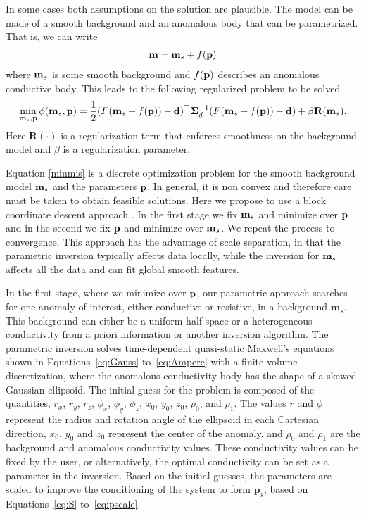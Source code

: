 \documentclass[letterpaper,11pt]{article}
\newcommand{\bfm}{{\bf m}}
\newcommand{\bfd}{{\bf d}}
\newcommand{\bfp}{{\bf p}}
\newcommand{\hf}{\frac 12}
\newcommand{\bfSigma}{{\boldsymbol \Sigma}}
\begin{document}
In some cases both assumptions on the solution are plausible. The model can be made of
a smooth background and an anomalous body that can be parametrized. That is, we can write
\begin{eqnarray}
\label{modfun2}
\bfm = \bfm_{s} + f(\bfp)
\end{eqnarray}
where $\bfm_{s}$ is some smooth background and $f(\bfp)$ describes an anomalous conductive
body. This leads to the following regularized problem to be solved
\begin{eqnarray}
\label{minmis}
\min_{\bfm_{s},\bfp} \phi(\bfm_{s},\bfp) =  \hf (F(\bfm_{s}+f(\bfp)) - \bfd)^{\top}\bfSigma_{d}^{-1}(F(\bfm_{s} + f(\bfp)) - \bfd)
+ \beta \mathbf{R}(\bfm_{s}).
\end{eqnarray}
Here $\mathbf{R}(\cdot)$ is a regularization term that enforces smoothness on the background model
and $\beta$ is a regularization parameter.

Equation \eqref{minmis} is a discrete optimization problem for the smooth background model $\bfm_{s}$
and the parameters $\bfp$. In general, it is non convex and therefore care must be taken to obtain
feasible solutions.
Here we propose to use a block coordinate descent approach \cite[]{Gill}. In the first stage
we fix $\bfm_{s}$ and minimize over $\bfp$ and in the second we fix $\bfp$ and minimize over $\bfm_{s}$.
We repeat the process to convergence.
This approach has the advantage of scale separation, in that the parametric inversion typically affects data locally, while the inversion for $\bfm_{s}$ affects all the data and can fit global smooth features. 

In the first stage, where we minimize over $ \bfp $, our parametric approach searches for one anomaly of interest, either conductive or resistive, in a background $ \mathbf{m}_s $. This background can either be a uniform half-space or a heterogeneous conductivity from a priori information or another inversion algorithm. The parametric inversion solves time-dependent quasi-static Maxwell's equations shown in Equations~\ref{eq:Gauss} to~\ref{eq:Ampere} with a finite volume discretization, where the anomalous conductivity body has the shape of a skewed Gaussian ellipsoid. The initial guess for the problem is composed of the quantities, $ r_x $, $ r_y $, $ r_z $, $ \phi_x $, $ \phi_y $, $ \phi_z $, $ x_0 $, $ y_0 $, $ z_0 $, $ \rho_0 $, and $ \rho_1 $. The values $ r $ and $ \phi $ represent the radius and rotation angle of the ellipsoid in each Cartesian direction, $ x_0 $, $ y_0 $ and $ z_0 $ represent the center of the anomaly, and $ \rho_0 $ and $ \rho_1 $ are the background and anomalous conductivity values.  These conductivity values can be fixed by the user, or alternatively, the optimal conductivity can be set as a parameter in the inversion. Based on the initial guesses, the parameters are scaled to improve the conditioning of the system to form $ \mathbf{p}_s $, based on Equations~\ref{eq:S} to~\ref{eq:pscale}.
\end{document}
